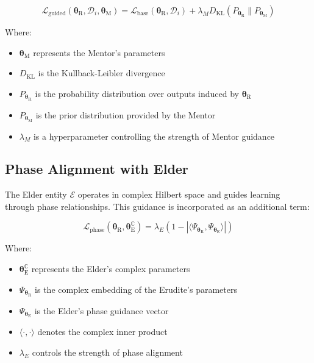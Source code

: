 \begin{equation}
\mathcal{L}_{\textrm{guided}}(\boldsymbol{\theta}_{\textrm{R}}, \mathcal{D}_i, \boldsymbol{\theta}_{\textrm{M}}) = \mathcal{L}_{\textrm{base}}(\boldsymbol{\theta}_{\textrm{R}}, \mathcal{D}_i) + \lambda_M D_{\textrm{KL}}(P_{\boldsymbol{\theta}_{\textrm{R}}} \| P_{\boldsymbol{\theta}_{\textrm{M}}})
\end{equation}

Where:
\begin{itemize}
    \item $\boldsymbol{\theta}_{\textrm{M}}$ represents the Mentor's parameters
    \item $D_{\textrm{KL}}$ is the Kullback-Leibler divergence
    \item $P_{\boldsymbol{\theta}_{\textrm{R}}}$ is the probability distribution over outputs induced by $\boldsymbol{\theta}_{\textrm{R}}$
    \item $P_{\boldsymbol{\theta}_{\textrm{M}}}$ is the prior distribution provided by the Mentor
    \item $\lambda_M$ is a hyperparameter controlling the strength of Mentor guidance
\end{itemize}

\subsection{Phase Alignment with Elder}

The Elder entity $\mathcal{E}$ operates in complex Hilbert space and guides learning through phase relationships. This guidance is incorporated as an additional term:

\begin{equation}
\mathcal{L}_{\textrm{phase}}(\boldsymbol{\theta}_{\textrm{R}}, \boldsymbol{\theta}_{\textrm{E}}^{\mathbb{C}}) = \lambda_E (1 - |\langle \Psi_{\boldsymbol{\theta}_{\textrm{R}}}, \Psi_{\boldsymbol{\theta}_{\textrm{E}}} \rangle|)
\end{equation}

Where:
\begin{itemize}
    \item $\boldsymbol{\theta}_{\textrm{E}}^{\mathbb{C}}$ represents the Elder's complex parameters
    \item $\Psi_{\boldsymbol{\theta}_{\textrm{R}}}$ is the complex embedding of the Erudite's parameters
    \item $\Psi_{\boldsymbol{\theta}_{\textrm{E}}}$ is the Elder's phase guidance vector
    \item $\langle \cdot, \cdot \rangle$ denotes the complex inner product
    \item $\lambda_E$ controls the strength of phase alignment
\end{itemize}

